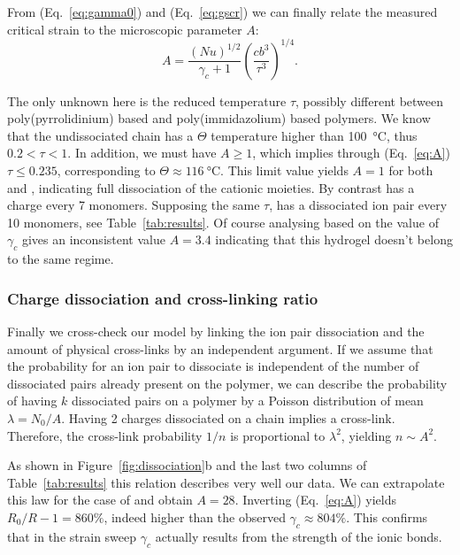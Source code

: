 \documentclass[journal=jacsat,manuscript=article]{achemso}
\begin{document}
From (Eq.~\ref{eq:gamma0}) and (Eq.~\ref{eq:gscr}) we can finally relate the measured critical strain to the microscopic parameter $A$:
\begin{equation}
A = \frac{\left(N u\right)^{1/2}}{\gamma_c+1}\left(\frac{c b^3}{\tau^3}\right)^{1/4}.
\label{eq:A}
\end{equation}

The only unknown here is the reduced temperature $\tau$, possibly different between poly(pyrrolidinium) based and poly(immidazolium) based polymers. We know that the undissociated chain has a $\Theta$ temperature higher than \SI{100}{\celsius}, thus $0.2<\tau<1$. In addition, we must have $A\geq 1$, which implies through (Eq.~\ref{eq:A}) $\tau\leq 0.235$, corresponding to $\Theta\approx\SI{116}{\celsius}$. This limit value yields $A=1$ for both  and , indicating full dissociation of the cationic moieties. By contrast  has a charge every 7 monomers. Supposing the same $\tau$,  has a dissociated ion pair every 10 monomers, see Table~\ref{tab:results}. Of course analysing  based on the value of $\gamma_c$ gives an inconsistent value $A=3.4$ indicating that this hydrogel doesn't belong to the same regime.

\subsubsection{Charge dissociation and cross-linking ratio}

Finally we cross-check our model by linking the ion pair dissociation and the amount of physical cross-links by an independent argument. If we assume that the probability for an ion pair to dissociate is independent of the number of dissociated pairs already present on the polymer, we can describe the probability of having $k$ dissociated pairs on a polymer by a Poisson distribution of mean $\lambda = N_0/A$. Having 2 charges dissociated on a chain implies a cross-link. Therefore, the cross-link probability $1/n$ is proportional to $\lambda^2$, yielding $n \sim A^2$.

As shown in Figure~\ref{fig:dissociation}b and the last two columns of Table~\ref{tab:results} this relation describes very well our data. We can extrapolate this law for the case of  and obtain $A = 28$. Inverting (Eq.~\ref{eq:A}) yields $R_0/R - 1 = 860\%$, indeed higher than the observed $\gamma_c\approx 804\%$. This confirms that in the  strain sweep $\gamma_c$ actually results from the strength of the ionic bonds.
\end{document}
